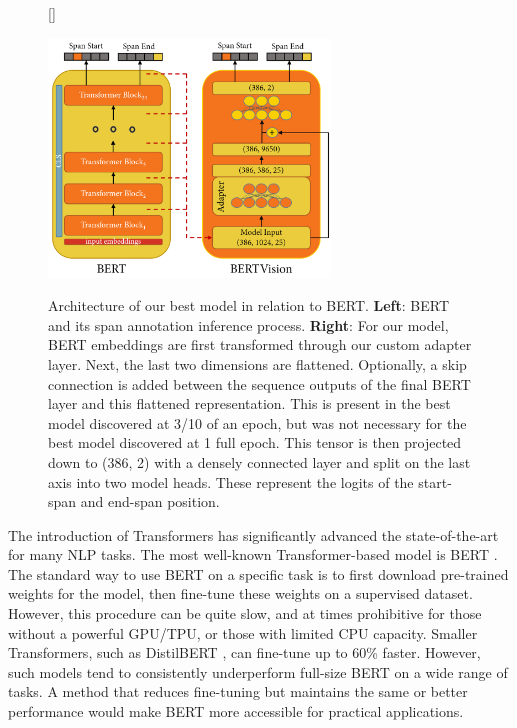 \begin{figure}[!h]
	[\FBwidth]
	{\caption{Architecture of our best model in relation to BERT. \textbf{Left}: BERT and its span annotation inference process. \textbf{Right}: For our model, BERT embeddings are first transformed through our custom adapter layer. Next, the last two dimensions are flattened. Optionally, a skip connection is added between the sequence outputs of the final BERT layer and this flattened representation. This is present in the best model discovered at 3/10 of an epoch, but was not necessary for the best model discovered at 1 full epoch. This tensor is then projected down to (386, 2) with a densely connected layer and split on the last axis into two model heads.  These represent the logits of the start-span and end-span position.}\label{fig:architecture}}
	{\includegraphics[width=7.5cm]{images/BERTVision_QA_Model.png}}
\end{figure}

\label{sec:Introduction}

\doubleline

The introduction of Transformers \cite{Vaswani2017} has significantly advanced the state-of-the-art for many NLP tasks. The most well-known Transformer-based model is BERT \cite{Devlin2019}. The standard way to use BERT on a specific task is to first download pre-trained weights for the model, then fine-tune these weights on a supervised dataset. However, this procedure can be quite slow, and at times prohibitive for those without a powerful GPU/TPU, or those with limited CPU capacity. Smaller Transformers, such as DistilBERT \cite{sanh2019distilbert}, can fine-tune up to 60\% faster. However, such models tend to consistently underperform full-size BERT on a wide range of tasks. A method that reduces fine-tuning but maintains the same or better performance would make BERT more accessible for practical applications.

